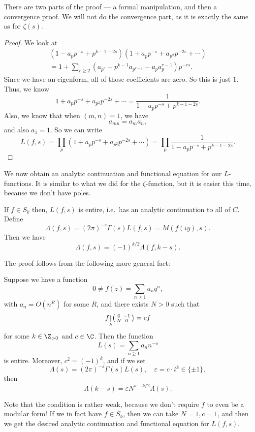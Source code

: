 \documentclass[a4paper]{article}
\begin{document}
There are two parts of the proof --- a formal manipulation, and then a convergence proof. We will not do the convergence part, as it is exactly the same as for $\zeta(s)$.
\begin{proof}
  We look at
  \begin{multline*}
    (1 - a_p p^{-s} + p^{k - 1 - 2s}) (1 + a_p p^{-s} + a_{p^2} p^{-2s} + \cdots) \\
    = 1 + \sum_{r \geq 2} (a_{p^r} + p^{k - 1} a_{p^{r - 2}} - a_p a_p^{r - 1}) p^{-rs}.
  \end{multline*}
  Since we have an eigenform, all of those coefficients are zero. So this is just $1$. Thus, we know
  \[
    1 + a_p p^{-s} + a_{p^2} p^{-2s} + \cdots = \frac{1}{1 - a_p p^{-s} + p^{k - 1 - 2s}}.
  \]
  Also, we know that when $(m, n) = 1$, we have
  \[
    a_{mn} = a_m a_n,
  \]
  and also $a_1 = 1$. So we can write
  \[
    L(f, s) = \prod_p (1 + a_p p^{-s} + a_{p^2} p^{-2s} + \cdots) = \prod_p \frac{1}{1 - a_p p^{-s} + p^{k - 1 - 2s}}.
  \]
\end{proof}

We now obtain an analytic continuation and functional equation for our $L$-functions. It is similar to what we did for the $\zeta$-function, but it is easier this time, because we don't have poles.
\begin{thm}
  If $f \in S_k$ then, $L(f, s)$ is entire, i.e.\ has an analytic continuation to all of $C$. Define
  \[
    \Lambda(f, s) = (2\pi)^{-s} \Gamma(s) L(f, s) = M(f(iy), s).
  \]
  Then we have
  \[
    \Lambda(f, s) = (-1)^{k/2} \Lambda(f, k - s).
  \]
\end{thm}

The proof follows from the following more general fact:
\begin{thm}
  Suppose we have a function
  \[
    0 \not= f(z) = \sum_{n \geq 1} a_n q^n,
  \]
  with $a_n = O(n^R)$ for some $R$, and there exists $N > 0$ such that
  \[
    f\underset{k}{|}
    \begin{psmallmatrix}
      0 & -1\\
      N & 0
    \end{psmallmatrix} = cf
  \]
  for some $k \in \Z_{> 0}$ and $c \in \C$. Then the function
  \[
    L(s) = \sum_{n \geq 1} a_n n^{-s}
  \]
  is entire. Moreover, $c^2 = (-1)^k$, and if we set
  \[
    \Lambda(s) = (2\pi)^{-s} \Gamma(s) L(s), \quad \varepsilon = c \cdot i^k \in \{\pm 1\},
  \]
  then
  \[
    \Lambda(k - s) = \varepsilon N^{s - k/2} \Lambda(s).
  \]
\end{thm}
Note that the condition is rather weak, because we don't require $f$ to even be a modular form! If we in fact have $f \in S_k$, then we can take $N = 1, c = 1$, and then we get the desired analytic continuation and functional equation for $L(f, s)$.
\end{document}
